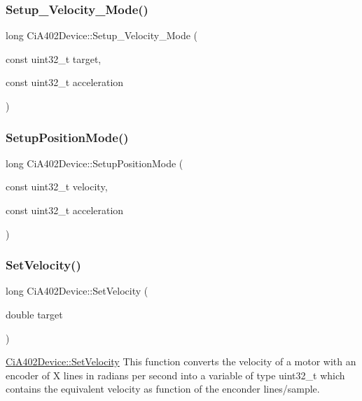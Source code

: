 \subsubsection{\texorpdfstring{Setup\+\_\+\+Velocity\+\_\+\+Mode()}{Setup\_Velocity\_Mode()}}
{\footnotesize\ttfamily long Ci\+A402\+Device\+::\+Setup\+\_\+\+Velocity\+\_\+\+Mode (\begin{DoxyParamCaption}\item[{const uint32\+\_\+t}]{target,  }\item[{const uint32\+\_\+t}]{acceleration }\end{DoxyParamCaption})}

\mbox{\label{classCiA402Device_a221dbc5461823097981727a3baff5d0c}} 
\subsubsection{\texorpdfstring{Setup\+Position\+Mode()}{SetupPositionMode()}}
{\footnotesize\ttfamily long Ci\+A402\+Device\+::\+Setup\+Position\+Mode (\begin{DoxyParamCaption}\item[{const uint32\+\_\+t}]{velocity,  }\item[{const uint32\+\_\+t}]{acceleration }\end{DoxyParamCaption})}

\mbox{\label{classCiA402Device_a498224b82a857197eb2d28beddc74729}} 
\subsubsection{\texorpdfstring{Set\+Velocity()}{SetVelocity()}}
{\footnotesize\ttfamily long Ci\+A402\+Device\+::\+Set\+Velocity (\begin{DoxyParamCaption}\item[{double}]{target }\end{DoxyParamCaption})}



\hyperlink{classCiA402Device_a498224b82a857197eb2d28beddc74729}{Ci\+A402\+Device\+::\+Set\+Velocity} This function converts the velocity of a motor with an encoder of X lines in radians per second into a variable of type uint32\+\_\+t which contains the equivalent velocity as function of the enconder lines/sample. 


